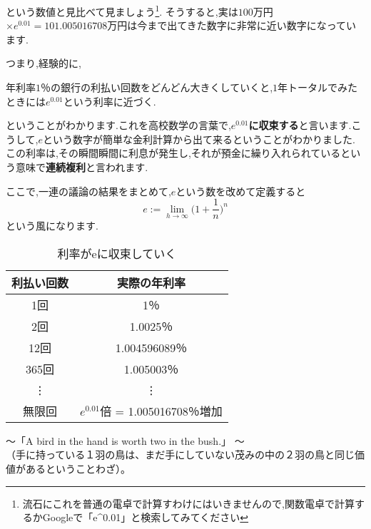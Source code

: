 という数値と見比べて見ましょう\footnote{流石にこれを普通の電卓で計算すわけにはいきませんので,関数電卓で計算するかGoogleで「e\^{}0.01」と検索してみてください}.
そうすると,実は$100$万円$\times e^{0.01} =  101.005016708$万円は今まで出てきた数字に非常に近い数字になっています.\par
つまり,経験的に,
\begin{center}
年利率$1$％の銀行の利払い回数をどんどん大きくしていくと,$1$年トータルでみたときには$e^{0.01}$という利率に近づく.
\end{center}
ということがわかります.これを高校数学の言葉で,{\bf $e^{0.01}$に収束する}と言います.こうして,$e$という数字が簡単な金利計算から出て来るということがわかりました.
この利率は,その瞬間瞬間に利息が発生し,それが預金に繰り入れられているという意味で{\bf 連続複利}と言われます.\par
ここで,一連の議論の結果をまとめて,$e$という数を改めて定義すると
\[
e := \lim_{h \to \infty} \biggl( 1 + \frac{1}{n}\biggl)^n
\]
という風になります.
\begin{table}[hbtp]
  \caption{利率がeに収束していく}
  \label{table:data_type}
  \centering
  \begin{tabular}{c|c}
    \hline
    利払い回数  & 実際の年利率  \\
    \hline \hline
    1回  & 1％ \\
    2回  & 1.0025％ \\
    12回  & 1.004596089％ \\
    365回  &  1.005003％\\
	\vdots & \vdots \\
	無限回 & $e^{0.01}$倍 = 1.005016708％増加\\
    \hline
  \end{tabular}
\end{table}

\begin{flushright}
〜「A bird in the hand is worth two in the bush.」 〜\\
（手に持っている１羽の鳥は、まだ手にしていない茂みの中の２羽の鳥と同じ価値があるということわざ）。
\end{flushright}

